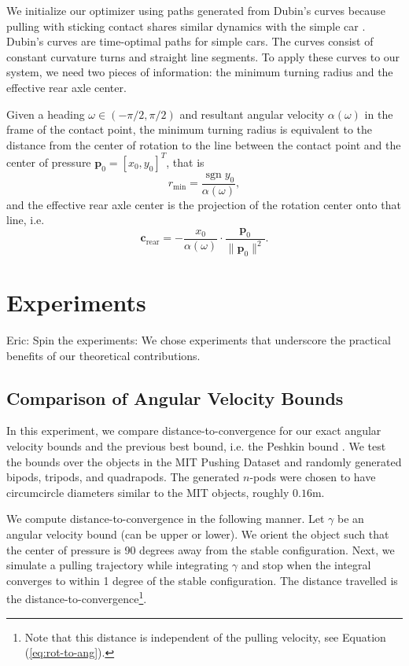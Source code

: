 \documentclass[conference]{IEEEtran}
\DeclareMathOperator{\sign}{\text{sgn}}
\newcommand{\EH}[1]{{\color{blue} {Eric: {#1}}  }}
\begin{document}
We initialize our optimizer using paths generated from Dubin's curves
\cite{dubins1957curves} because pulling with sticking contact shares
similar dynamics with the simple car \cite{lavalle1999planning}.
Dubin's curves are time-optimal paths for simple cars. The curves
consist of constant curvature turns and straight line segments. To
apply these curves to our system, we need two pieces of information:
the minimum turning radius and the effective rear axle center. 

Given a heading $\omega \in (-\pi/2,\pi/2) $ and resultant angular velocity
$\alpha(\omega)$ in the frame of the contact point, the minimum
turning radius is equivalent to the distance from the center of
rotation to the line between the contact point and the center of
pressure $\mathbf{p}_0 = [x_0,y_0]^T$, that is
\begin{equation}
  r_{\text{min}} = \frac{\sign y_0}{\alpha(\omega)},
\end{equation}
and the effective rear axle center is the projection of the rotation center onto that line, i.e.
\begin{equation}
  \mathbf{c}_{\text{rear}} = -\frac{x_0}{\alpha(\omega)}\cdot\frac{\mathbf{p}_0}{\lVert \mathbf{p}_0 \rVert^2}.
\end{equation}


\section{Experiments}\label{sec:experiments}
\EH{Spin the experiments: We chose experiments that underscore the
  practical benefits of our theoretical contributions.}

\subsection{Comparison of
  Angular Velocity Bounds}\label{sec:bound-comparison}

In this experiment, we compare distance-to-convergence for our exact
angular velocity bounds and the previous best bound, i.e. the Peshkin
bound \cite{peshkin1988motion}. We test the bounds over the objects in
the MIT Pushing Dataset \cite{YuBFR16} and randomly generated bipods,
tripods, and quadrapods. The generated $n$-pods were chosen to have
circumcircle diameters similar to the MIT objects, roughly $0.16$m.

We compute distance-to-convergence in the following manner. Let
$\gamma$ be an angular velocity bound (can be upper or lower). We
orient the object such that the center of pressure is 90 degrees away
from the stable configuration. Next, we simulate a pulling trajectory
while integrating $\gamma$ and stop when the integral converges to
within 1 degree of the stable configuration. The distance travelled is
the distance-to-convergence\footnote{Note that this distance is
  independent of the pulling velocity, see Equation
  (\ref{eq:rot-to-ang}).}.
\end{document}
